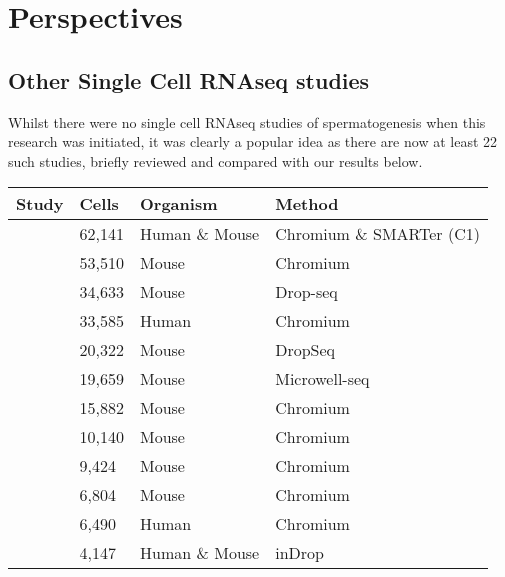 \chapter{\label{ch:4-discuss}Perspectives}

\minitoc


\section{Other Single Cell RNAseq studies}
Whilst there were no single cell RNAseq studies of spermatogenesis when this research was initiated, it was clearly a popular idea as there are now at least 22 such studies, briefly reviewed and compared with our results below.


\begin{table}[]
	\begin{tabular}{@{}llll@{}}
		\toprule
		Study                                                & Cells   & Organism       & Method \\ \midrule
		\cite{Hermann2018Mammalian}		& 62,141  & Human \& Mouse & Chromium \& SMARTer (C1) \\
		\cite{Ernst2019Staged}					& 53,510  & Mouse          & Chromium\\
		\cite{Green2018Comprehensive}	& 34,633  & Mouse          & Drop-seq    \\
		\cite{Sohni2019Neonatal}				& 33,585  & Human          & Chromium             \\
		\cite{Jung2019Unified}              & 20,322  & Mouse          & DropSeq                  \\
		\cite{Han2018Mapping}               & 19,659  & Mouse          & Microwell-seq          \\
		\cite{Grive2019Dynamic}             & 15,882  & Mouse          & Chromium                \\
		\cite{Law2019Developmental}         & 10,140  & Mouse          & Chromium             \\
		\cite{La2018Identification}         & 9,424   & Mouse          & Chromium                   \\
		\cite{Fang2019Proteomics}           & 6,804   & Mouse          & Chromium                \\
		\cite{Guo2018adult}                 & 6,490   & Human          & Chromium                  \\
		\cite{Xia2019Widespread}            & 4,147   & Human \& Mouse & inDrop            \\

\end{tabular}
\end{table}
